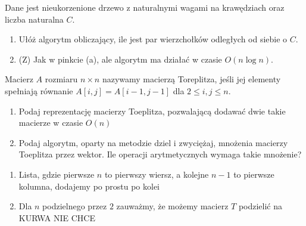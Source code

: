 \documentclass{article}
\begin{document}
\begin{problem}[5]{}
Dane jest nieukorzenione drzewo z naturalnymi wagami na krawędziach oraz liczba naturalna $C$.
\begin{enumerate}[label=(\alph*)]
    \item Ułóż algorytm obliczający, ile jest par wierzchołków odległych od siebie o $C$.
    \item (Z) Jak w pinkcie (a), ale algorytm ma działać w czasie $O(n\log n)$.
\end{enumerate}
\end{problem}

\begin{problem}[6]{}
Macierz $A$ rozmiaru $n\times n$ nazywamy macierzą Toreplitza, jeśli jej elementy spełniają równanie $A[i,j]=A[i-1,j-1]$ dla $2\leq i,j\leq n$.
\begin{enumerate}[label=(\alph*)]
    \item Podaj reprezentację macierzy Toeplitza, pozwalającą dodawać dwie takie macierze w czasie $O(n)$
    \item Podaj algorytm, oparty na metodzie dziel i zwyciężaj, mnożenia macierzy Toeplitza przez wektor. Ile operacji arytmetycznych wymaga takie mnożenie?
\end{enumerate}
\end{problem}

\begin{enumerate}[label=(\alpha*), leftmargin=*]
    \item Lista, gdzie pierwsze $n$ to pierwszy wiersz, a kolejne $n-1$ to pierwsze kolumna, dodajemy po prostu po kolei
    \item Dla $n$ podzielnego przez $2$ zauważmy, że możemy macierz $T$ podzielić na KURWA NIE CHCE
\end{enumerate}
\end{document}
